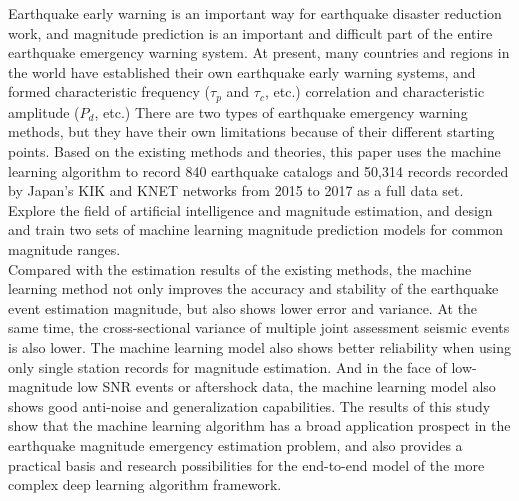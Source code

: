 \begin{eabstract}
\indent Earthquake early warning is an important way for earthquake disaster reduction work, and magnitude prediction is an important and difficult part of the entire earthquake emergency warning system. At present, many countries and regions in the world have established their own earthquake early warning systems, and formed characteristic frequency ($\tau_{p}$ and $\tau_{c}$, etc.) correlation and characteristic amplitude ($P_{ d}$, etc.) There are two types of earthquake emergency warning methods, but they have their own limitations because of their different starting points. Based on the existing methods and theories, this paper uses the machine learning algorithm to record 840 earthquake catalogs and 50,314 records recorded by Japan's KIK and KNET networks from 2015 to 2017 as a full data set. Explore the field of artificial intelligence and magnitude estimation, and design and train two sets of machine learning magnitude prediction models for common magnitude ranges. \\
\indent Compared with the estimation results of the existing methods, the machine learning method not only improves the accuracy and stability of the earthquake event estimation magnitude, but also shows lower error and variance. At the same time, the cross-sectional variance of multiple joint assessment seismic events is also lower. The machine learning model also shows better reliability when using only single station records for magnitude estimation. And in the face of low-magnitude low SNR events or aftershock data, the machine learning model also shows good anti-noise and generalization capabilities. The results of this study show that the machine learning algorithm has a broad application prospect in the earthquake magnitude emergency estimation problem, and also provides a practical basis and research possibilities for the end-to-end model of the more complex deep learning algorithm framework.\\
\end{eabstract}

